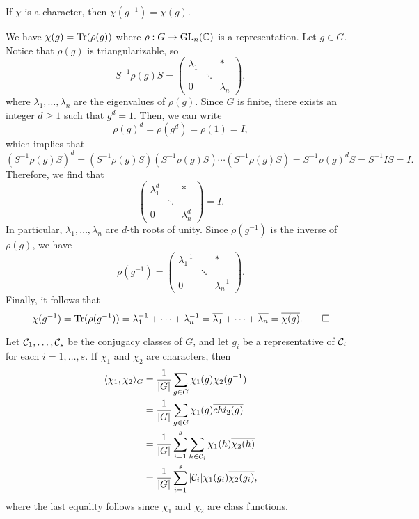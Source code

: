\begin{remark}{}
    If $\chi$ is a character, then $\chi(g^{-1}) = \overline{\chi(g)}$. 
\end{remark}
\begin{pf}
    We have $\chi(g) = \operatorname{Tr}(\rho(g))$ where $\rho : G \to \operatorname{GL}_n(\mathbb{C})$ is a 
    representation. Let $g \in G$. Notice that $\rho(g)$ is triangularizable, 
    so 
    \[ S^{-1}\rho(g)S = \begin{pmatrix}
        \lambda_1 & & * \\ & \ddots & \\ 0 & & \lambda_n 
    \end{pmatrix}, \] 
    where $\lambda_1, \dots, \lambda_n$ are the eigenvalues of $\rho(g)$. 
    Since $G$ is finite, there exists an integer $d \geq 1$ such that $g^d = 1$. 
    Then, we can write 
    \[ \rho(g)^d = \rho(g^d) = \rho(1) = I, \] 
    which implies that 
    \[ (S^{-1}\rho(g)S)^d = (S^{-1}\rho(g)S)(S^{-1}\rho(g)S)\cdots 
    (S^{-1}\rho(g)S) = S^{-1}\rho(g)^d S = S^{-1}IS = I. \] 
    Therefore, we find that 
    \[ \begin{pmatrix}
        \lambda_1^d & & * \\ & \ddots & \\ 0 & & \lambda_n^d 
    \end{pmatrix} = I. \] 
    In particular, $\lambda_1, \dots, \lambda_n$ are $d$-th roots of unity. 
    Since $\rho(g^{-1})$ is the inverse of $\rho(g)$, we have 
    \[ \rho(g^{-1}) = \begin{pmatrix}
        \lambda_1^{-1} & & * \\ & \ddots & \\ 0 & & \lambda_n^{-1} 
    \end{pmatrix}. \] 
    Finally, it follows that 
    \[ \chi(g^{-1}) = \operatorname{Tr}(\rho(g^{-1})) = \lambda_1^{-1} + \cdots + \lambda_n^{-1}
    = \overline{\lambda_1} + \cdots + \overline{\lambda_n} = \overline{\chi(g)}. 
    \qedhere \] 
\end{pf}

Let ${\cal C}_1, \dots, {\cal C}_s$ be the conjugacy classes of $G$, and let 
$g_i$ be a representative of ${\cal C}_i$ for each $i = 1, \dots, s$. 
If $\chi_1$ and $\chi_2$ are characters, then 
\begin{align*}
    \langle \chi_1, \chi_2 \rangle_G 
    &= \frac1{|G|} \sum_{g\in G} \chi_1(g) \chi_2(g^{-1}) \\ 
    &= \frac1{|G|} \sum_{g\in G} \chi_1(g) \overline{chi_2(g)} \\ 
    &= \frac1{|G|} \sum_{i=1}^s \sum_{h\in{\cal C}_i} \chi_1(h) \overline{\chi_2(h)} \\
    &= \frac1{|G|} \sum_{i=1}^s |{\cal C}_i| \chi_1(g_i) \overline{\chi_2(g_i)},
\end{align*}
where the last equality follows since $\chi_1$ and $\chi_2$ are class functions. 

